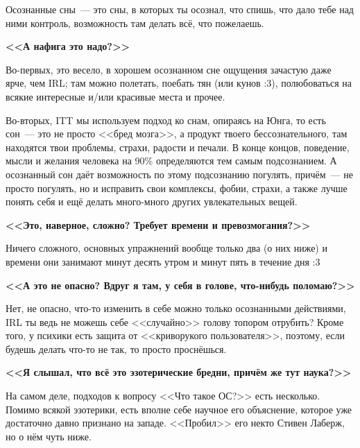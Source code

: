 \documentclass[a5paper,12pt,twoside]{memoir}
\begin{document}
Осознанные сны~--- это  сны, в которых ты осознал, что спишь, что дало тебе над ними контроль, возможность там делать всё, что пожелаешь.

\begin{center}
\bfseries{<<А нафига это надо?>>}
\end{center}


Во-первых, это весело, в хорошем осознанном сне ощущения зачастую даже ярче, чем IRL; там можно полетать, поебать тян (или кунов :3), полюбоваться на всякие интересные и/или красивые места и прочее.

Во-вторых, ITT мы используем подход ко снам, опираясь на Юнга, то есть сон~--- это не просто <<бред мозга>>, а продукт твоего бессознательного, там находятся твои проблемы, страхи, радости и печали. В конце концов, поведение, мысли и желания человека на 90\% определяются тем самым подсознанием. А осознанный сон даёт возможность по этому подсознанию погулять, причём~--- не просто погулять, но и исправить свои комплексы, фобии, страхи, а также лучше понять себя и ещё делать много-много других увлекательных вещей. 


\begin{center}
\bfseries{<<Это, наверное, сложно? Требует времени и превозмогания?>>}
\end{center}


Ничего сложного, основных упражнений вообще только два (о них ниже) и времени они занимают минут десять утром и минут пять в течение дня :3 

\begin{center}
\bfseries{<<А это не опасно? Вдруг я там, у себя в голове, что-нибудь поломаю?>>}
\end{center}


Нет, не опасно, что-то изменить в себе можно только осознанными действиями, IRL ты ведь не можешь себе <<случайно>> голову топором отрубить? Кроме того, у психики есть защита от <<криворукого пользователя>>, поэтому, если будешь делать что-то не так, то просто проснёшься. 

\begin{center}
\bfseries{<<Я слышал, что всё это эзотерические бредни, причём же тут наука?>>}
\end{center}


На самом деле, подходов к вопросу <<Что такое ОС?>> есть несколько. Помимо всякой эзотерики, есть вполне себе научное его объяснение, которое уже достаточно давно признано на западе. <<Пробил>> его некто Стивен Лаберж, но о нём чуть ниже.
 
\end{document}

